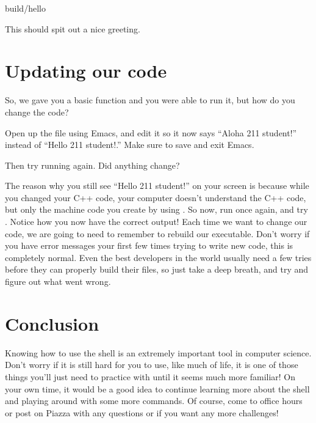 \documentclass{tufte-handout}
\begin{document}
\begin{CmdLine}
  \prompt build/hello
\end{CmdLine}

\noindent
This should spit out a nice greeting.

\section{Updating our code}

So, we gave you a basic function and you were able to run it, but how do
you change the code?

Open up the  file using Emacs, and edit it so it
now says ``Aloha 211 student!'' instead of ``Hello 211 student!.'' Make
sure to save and exit Emacs.

Then try running  again. Did anything change?

The reason why you still see ``Hello 211 student!'' on your screen is
because while you changed your C++ code, your computer doesn't
understand the C++ code, but only the machine code you create by using
.  So now, run  once again, and
try . Notice how you now have the correct output!
Each time we want to change our code, we are going to need to remember
to rebuild our executable. Don't worry if you have error messages your
first few times trying to write new code, this is completely normal.
Even the best developers in the world usually need a few tries before
they can properly build their files, so just take a deep breath, and try
and figure out what went wrong.

\section{Conclusion}

Knowing how to use the shell is an extremely important tool in computer
science. Don't worry if it is still hard for you to use, like much of
life, it is one of those things you'll just need to practice with until
it seems much more familiar!  On your own time, it would be a good idea
to continue learning more about the shell and playing around with some
more commands.
Of course, come to office hours or post on Piazza with any questions or
if you want any more challenges!
\end{document}
